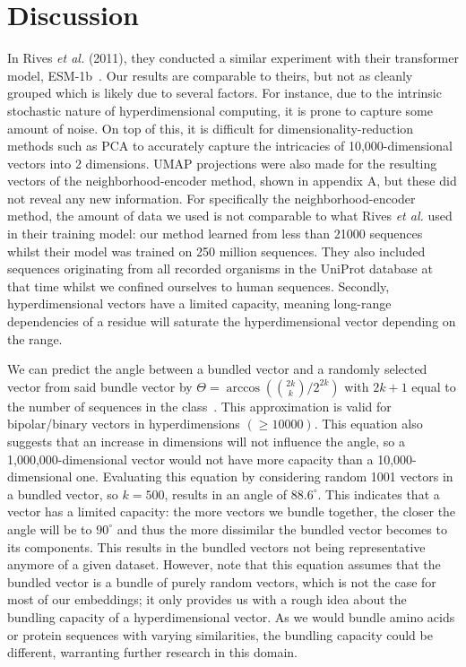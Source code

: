 \section{Discussion}\label{sec:dis3}
In Rives \textit{et al.} (2011), they conducted a similar experiment with their transformer model, ESM-1b~\cite{esm}. Our results are comparable to theirs, but not as cleanly grouped which is likely due to several factors. For instance, due to the intrinsic stochastic nature of hyperdimensional computing, it is prone to capture some amount of noise. On top of this, it is difficult for dimensionality-reduction methods such as PCA to accurately capture the intricacies of 10,000-dimensional vectors into 2 dimensions. UMAP projections were also made for the resulting vectors of the neighborhood-encoder method, shown in appendix A, but these did not reveal any new information. For specifically the neighborhood-encoder method, the amount of data we used is not comparable to what Rives \textit{et al.} used in their training model: our method learned from less than 21000 sequences whilst their model was trained on 250 million sequences. They also included sequences originating from all recorded organisms in the UniProt database at that time whilst we confined ourselves to human sequences. Secondly, hyperdimensional vectors have a limited capacity, meaning long-range dependencies of a residue will saturate the hyperdimensional vector depending on the range.

We can predict the angle between a bundled vector and a randomly selected vector from said bundle vector by $\Theta = \arccos({2k \choose k}/2^{2k})$ with $2k+1$ equal to the number of sequences in the class~\cite{sathdv}. This approximation is valid for bipolar/binary vectors in hyperdimensions $(\ge 10000)$. This equation also suggests that an increase in dimensions will not influence the angle, so a 1,000,000-dimensional vector would not have more capacity than a 10,000-dimensional one. Evaluating this equation by considering random 1001 vectors in a bundled vector, so $k = 500$, results in an angle of $88.6^{\circ}$. This indicates that a vector has a limited capacity: the more vectors we bundle together, the closer the angle will be to $90^{\circ}$ and thus the more dissimilar the bundled vector becomes to its components. This results in the bundled vectors not being representative anymore of a given dataset. However, note that this equation assumes that the bundled vector is a bundle of purely random vectors, which is not the case for most of our embeddings; it only provides us with a rough idea about the bundling capacity of a hyperdimensional vector. As we would bundle amino acids or protein sequences with varying similarities, the bundling capacity could be different, warranting further research in this domain.

